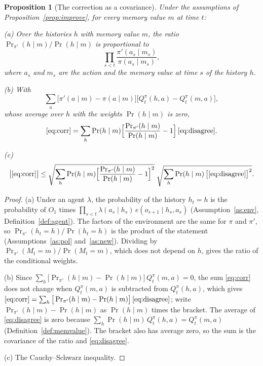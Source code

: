 \documentclass{article}
\newtheorem{proposition}{Proposition}[section]
\theoremstyle{definition}
\newcommand{\Prn}{\Pr\nolimits_{\pi'}}
\begin{document}
\begin{proposition}[The correction as a covariance]\label{prop:cov}
Under the assumptions of Proposition~\ref{prop:improve}, for every memory value $m$ at time $t$:

(a) Over the histories $h$ with memory value $m$, the ratio $\Prn(h\mid m)/\Pr(h\mid m)$ is proportional to
\[
\prod_{s<t}\frac{\pi'(a_s\mid m_s)}{\pi(a_s\mid m_s)},
\]
where $a_s$ and $m_s$ are the action and the memory value at time $s$ of the history $h$.

(b) With
\begin{equation}\label{eq:disagree}
\sum_a\big[\pi'(a\mid m)-\pi(a\mid m)\big]\big[Q^\pi_t(h,a)-Q^\pi_t(m,a)\big],
\end{equation}
whose average over $h$ with the weights $\Pr(h\mid m)$ is zero,
\[
\eqref{eq:corr}=\sum_h\Pr(h\mid m)\Big[\frac{\Prn(h\mid m)}{\Pr(h\mid m)}-1\Big]\,\eqref{eq:disagree}.
\]

(c)
\[
\big|\eqref{eq:corr}\big|\le\sqrt{\sum_h\Pr(h\mid m)\Big[\frac{\Prn(h\mid m)}{\Pr(h\mid m)}-1\Big]^2}\;\sqrt{\sum_h\Pr(h\mid m)\,\big[\eqref{eq:disagree}\big]^2}.
\]
\end{proposition}

\begin{proof}
(a) Under an agent $\lambda$, the probability of the history $h_t=h$ is the probability of $O_1$ times $\prod_{s<t}\lambda(a_s\mid h_s)\,e(o_{s+1}\mid h_s,a_s)$ (Assumption~\ref{as:env}, Definition~\ref{def:agent}). The factors of the environment are the same for $\pi$ and $\pi'$, so $\Prn(h_t=h)/\Pr(h_t=h)$ is the product of the statement (Assumptions~\ref{as:pol} and~\ref{as:new}). Dividing by $\Prn(M_t=m)/\Pr(M_t=m)$, which does not depend on $h$, gives the ratio of the conditional weights.

(b) Since $\sum_h\big[\Prn(h\mid m)-\Pr(h\mid m)\big]\,Q^\pi_t(m,a)=0$, the sum \eqref{eq:corr} does not change when $Q^\pi_t(m,a)$ is subtracted from $Q^\pi_t(h,a)$, which gives $\eqref{eq:corr}=\sum_h\big[\Prn(h\mid m)-\Pr(h\mid m)\big]\,\eqref{eq:disagree}$; write $\Prn(h\mid m)-\Pr(h\mid m)$ as $\Pr(h\mid m)$ times the bracket. The average of \eqref{eq:disagree} is zero because $\sum_h\Pr(h\mid m)\,Q^\pi_t(h,a)=Q^\pi_t(m,a)$ (Definition~\ref{def:memvalue}). The bracket also has average zero, so the sum is the covariance of the ratio and \eqref{eq:disagree}.

(c) The Cauchy--Schwarz inequality.
\end{proof}
\end{document}
